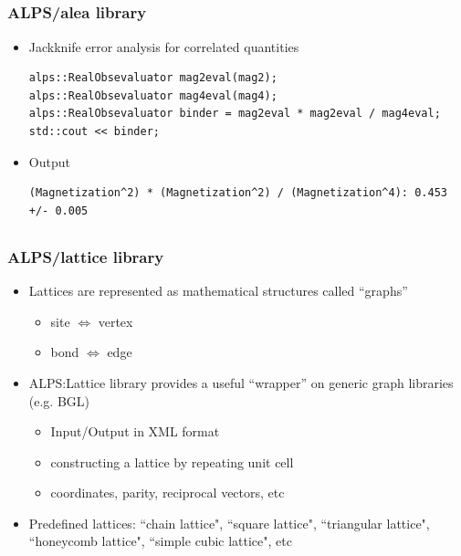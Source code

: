 \subsection*{\redm\whitem\greenb}
\begin{frame}[t,fragile]
  \frametitle{ALPS/alea library}
  \begin{itemize}
  \item Jackknife error analysis for correlated quantities
    \begin{lstlisting}
alps::RealObsevaluator mag2eval(mag2);
alps::RealObsevaluator mag4eval(mag4);
alps::RealObsevaluator binder = mag2eval * mag2eval / mag4eval;
std::cout << binder;
\end{lstlisting}
  \item Output
\begin{lstlisting}
(Magnetization^2) * (Magnetization^2) / (Magnetization^4): 0.453 +/- 0.005
\end{lstlisting}
  \end{itemize}
\end{frame}

\subsection*{\redm\whiteb\greenb}
\begin{frame}
  \frametitle{ALPS/lattice library}
  \begin{itemize}
    \setlength{\itemsep}{1em}
  \item Lattices are represented as mathematical structures called ``graphs''
    \begin{itemize}
    \item site $\Leftrightarrow$ vertex
    \item bond $\Leftrightarrow$ edge
    \end{itemize}
  \item ALPS:Lattice library provides a useful “wrapper” on generic graph libraries (e.g. BGL)
    \begin{itemize}
    \item Input/Output in XML format
    \item constructing a lattice by repeating unit cell
    \item coordinates, parity, reciprocal vectors, etc
    \end{itemize}
  \item Predefined lattices: ``chain lattice", ``square lattice", ``triangular lattice", ``honeycomb lattice", ``simple cubic lattice", etc
  \end{itemize}
\end{frame}

